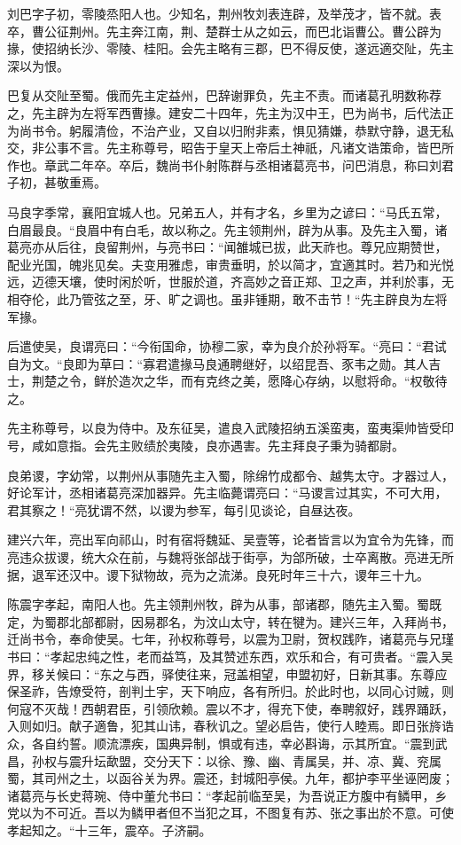 \documentclass[12pt,UTF8]{ctexbook}
\begin{document}
刘巴字子初，零陵烝阳人也。少知名，荆州牧刘表连辟，及举茂才，皆不就。表卒，曹公征荆州。先主奔江南，荆、楚群士从之如云，而巴北诣曹公。曹公辟为掾，使招纳长沙、零陵、桂阳。会先主略有三郡，巴不得反使，遂远適交阯，先主深以为恨。

巴复从交阯至蜀。俄而先主定益州，巴辞谢罪负，先主不责。而诸葛孔明数称荐之，先主辟为左将军西曹掾。建安二十四年，先主为汉中王，巴为尚书，后代法正为尚书令。躬履清俭，不治产业，又自以归附非素，惧见猜嫌，恭默守静，退无私交，非公事不言。先主称尊号，昭告于皇天上帝后土神祇，凡诸文诰策命，皆巴所作也。章武二年卒。卒后，魏尚书仆射陈群与丞相诸葛亮书，问巴消息，称曰刘君子初，甚敬重焉。

马良字季常，襄阳宜城人也。兄弟五人，并有才名，乡里为之谚曰：“马氏五常，白眉最良。“良眉中有白毛，故以称之。先主领荆州，辟为从事。及先主入蜀，诸葛亮亦从后往，良留荆州，与亮书曰：“闻雒城已拔，此天祚也。尊兄应期赞世，配业光国，魄兆见矣。夫变用雅虑，审贵垂明，於以简才，宜適其时。若乃和光悦远，迈德天壤，使时闲於听，世服於道，齐高妙之音正郑、卫之声，并利於事，无相夺伦，此乃管弦之至，牙、旷之调也。虽非锺期，敢不击节！“先主辟良为左将军掾。

后遣使吴，良谓亮曰：“今衔国命，协穆二家，幸为良介於孙将军。“亮曰：“君试自为文。“良即为草曰：“寡君遣掾马良通聘继好，以绍昆吾、豕韦之勋。其人吉士，荆楚之令，鲜於造次之华，而有克终之美，愿降心存纳，以慰将命。“权敬待之。

先主称尊号，以良为侍中。及东征吴，遣良入武陵招纳五溪蛮夷，蛮夷渠帅皆受印号，咸如意指。会先主败绩於夷陵，良亦遇害。先主拜良子秉为骑都尉。

良弟谡，字幼常，以荆州从事随先主入蜀，除绵竹成都令、越隽太守。才器过人，好论军计，丞相诸葛亮深加器异。先主临薨谓亮曰：“马谡言过其实，不可大用，君其察之！“亮犹谓不然，以谡为参军，每引见谈论，自昼达夜。

建兴六年，亮出军向祁山，时有宿将魏延、吴壹等，论者皆言以为宜令为先锋，而亮违众拔谡，统大众在前，与魏将张郃战于街亭，为郃所破，士卒离散。亮进无所据，退军还汉中。谡下狱物故，亮为之流涕。良死时年三十六，谡年三十九。

陈震字孝起，南阳人也。先主领荆州牧，辟为从事，部诸郡，随先主入蜀。蜀既定，为蜀郡北部都尉，因易郡名，为汶山太守，转在犍为。建兴三年，入拜尚书，迁尚书令，奉命使吴。七年，孙权称尊号，以震为卫尉，贺权践阼，诸葛亮与兄瑾书曰：“孝起忠纯之性，老而益笃，及其赞述东西，欢乐和合，有可贵者。“震入吴界，移关候曰：“东之与西，驿使往来，冠盖相望，申盟初好，日新其事。东尊应保圣祚，告燎受符，剖判土宇，天下响应，各有所归。於此时也，以同心讨贼，则何寇不灭哉！西朝君臣，引领欣赖。震以不才，得充下使，奉聘叙好，践界踊跃，入则如归。献子適鲁，犯其山讳，春秋讥之。望必启告，使行人睦焉。即日张旍诰众，各自约誓。顺流漂疾，国典异制，惧或有违，幸必斟诲，示其所宜。“震到武昌，孙权与震升坛歃盟，交分天下：以徐、豫、幽、青属吴，并、凉、冀、兖属蜀，其司州之土，以函谷关为界。震还，封城阳亭侯。九年，都护李平坐诬罔废；诸葛亮与长史蒋琬、侍中董允书曰：“孝起前临至吴，为吾说正方腹中有鳞甲，乡党以为不可近。吾以为鳞甲者但不当犯之耳，不图复有苏、张之事出於不意。可使孝起知之。“十三年，震卒。子济嗣。
\end{document}

